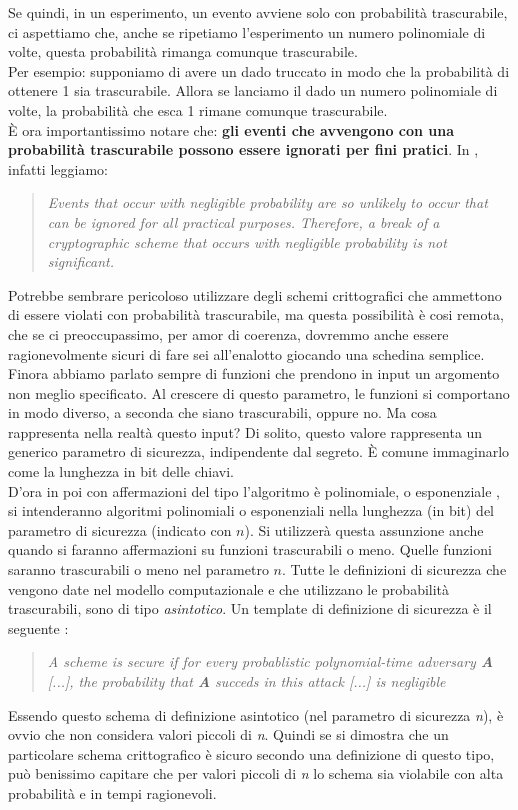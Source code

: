 \documentclass[a4paper,openright,twoside,12pt]{report}
\begin{document}
Se quindi, in un esperimento, un evento avviene solo con probabilit\`a trascurabile, ci aspettiamo che, anche se ripetiamo l'esperimento un numero polinomiale di volte, questa probabilit\`a
rimanga comunque trascurabile.\\
Per esempio: supponiamo di avere un dado truccato in modo che la probabilit\`a di ottenere 1 sia trascurabile. Allora se lanciamo il dado un numero polinomiale di volte, la probabilit\`a
che esca 1 rimane comunque trascurabile.\\
\`E ora importantissimo notare che:
\textbf{gli eventi che avvengono con una probabilit\`a trascurabile possono essere ignorati per fini pratici}.
In \cite{1206501}, infatti leggiamo:
\begin{quotation}
\emph{Events that occur with negligible probability are so unlikely to occur that can be ignored for all practical purposes. Therefore,
a break of a cryptographic scheme that occurs with negligible probability is not significant.}
\end{quotation}
Potrebbe sembrare pericoloso utilizzare degli schemi crittografici che ammettono di essere violati con probabilit\`a trascurabile, ma questa possibilit\`a \`e cosi remota, che se ci preoccupassimo, per amor di coerenza, dovremmo anche essere ragionevolmente sicuri di 
fare sei all'enalotto giocando una schedina semplice.
Finora abbiamo parlato sempre di funzioni che prendono in input un argomento non meglio specificato. 
Al crescere di questo parametro, le funzioni si comportano in modo diverso, a seconda che siano trascurabili, oppure no.
Ma cosa rappresenta nella realt\`a questo input?
Di solito, questo valore rappresenta un generico parametro di sicurezza, indipendente dal segreto. \`E comune immaginarlo come la lunghezza in bit delle chiavi.\\
D'ora in poi con affermazioni del tipo \flqq l'algoritmo \`e polinomiale, o esponenziale \frqq, si intenderanno algoritmi polinomiali o esponenziali nella lunghezza (in bit) del parametro di sicurezza (indicato con $n$). Si utilizzer\`a questa assunzione anche quando si faranno affermazioni su funzioni trascurabili o meno. Quelle funzioni saranno trascurabili o meno nel parametro $n$.
Tutte le definizioni di sicurezza che vengono date nel modello computazionale e che utilizzano le probabilit\`a trascurabili, sono di tipo \emph{asintotico}.
Un template di definizione di sicurezza è il seguente \cite{1206501}:
\begin{quotation}
\emph{A scheme is secure if for every probablistic polynomial-time adversary \textbf{A} [...], the probability that \textbf{A} succeds in this attack [...]
is negligible}
\end{quotation}
Essendo questo schema di definizione asintotico (nel parametro di sicurezza \emph{n}), \`e ovvio che non considera valori piccoli di \emph{n}.
Quindi se si dimostra che un particolare schema crittografico \`e sicuro secondo una definizione di questo tipo, pu\`o benissimo capitare che per valori piccoli di \emph{n} lo schema
sia violabile con alta probabilit\`a e in tempi ragionevoli.
\end{document}
